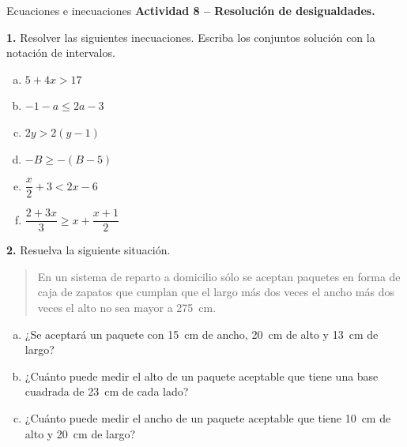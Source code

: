 \documentclass[9pt, aspectratio=169]{beamer}
\begin{document}
\begin{frame}{Ecuaciones e inecuaciones}
    \textbf{Actividad 8 -- Resolución de desigualdades.}

    \textbf{1.} Resolver las siguientes inecuaciones. Escriba los conjuntos solución con la notación de intervalos.
\begin{multicols}{3}
\begin{enumerate}[a)]
    \item $5 + 4 x > 17$
    \item $-1 -a \leq 2 a - 3$
    \item $2 y > 2(y-1)$
    \item $-B \geq -(B-5)$
    \item $\dfrac{x}{2} + 3 < 2 x - 6 $
    \item $\dfrac{2 + 3x}{3} \geq x + \dfrac{x + 1}{2} $
\end{enumerate}
\end{multicols}

\textbf{2.} Resuelva la siguiente situación.
\begin{quote}
    En un sistema de reparto a domicilio sólo se aceptan paquetes en forma de caja de zapatos que cumplan que el largo más dos veces el ancho más dos veces el alto no sea mayor a \qty{275}{cm}.
\end{quote} 
\vspace{-2em}
\begin{enumerate}[a)]
\item ¿Se aceptará un paquete con \qty{15}{cm} de ancho, \qty{20}{cm} de alto y \qty{13}{cm} de largo?
\item ¿Cuánto puede medir el alto de un paquete aceptable que tiene una base cuadrada de \qty{23}{cm} de cada lado?
\item ¿Cuánto puede medir el ancho de un paquete aceptable que tiene \qty{10}{cm} de alto y \qty{20}{cm} de largo?
\end{enumerate}
\end{frame}
\end{document}
